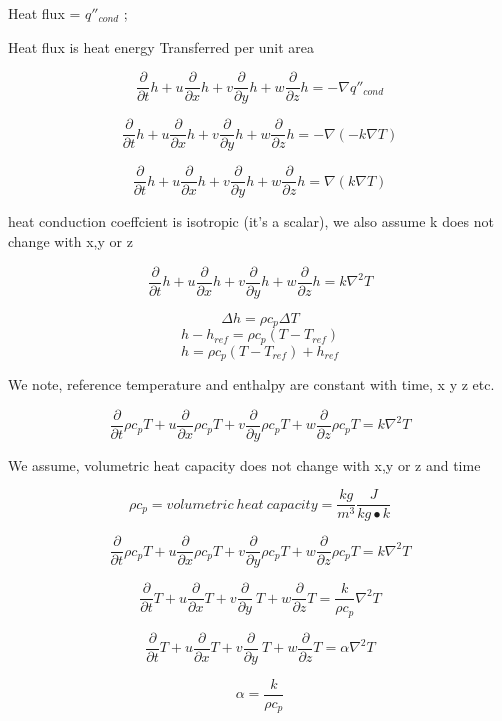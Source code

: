 \documentclass[11pt]{article}
\begin{document}
Heat flux = $q''_{cond}$ ; 

Heat flux is heat energy Transferred per unit area 

$$\frac{\partial }{\partial t} h + u \frac{\partial}{\partial x} h + v \frac{\partial }{\partial y} h + w \frac{\partial }{\partial z} h  = -\nabla q''_{cond} $$ 


$$\frac{\partial }{\partial t} h + u \frac{\partial}{\partial x} h + v \frac{\partial }{\partial y} h + w \frac{\partial }{\partial z} h  = -\nabla (- k \nabla T) $$ 

$$\frac{\partial }{\partial t} h + u \frac{\partial}{\partial x} h + v \frac{\partial }{\partial y} h + w \frac{\partial }{\partial z} h  = \nabla ( k \nabla T) $$ 

heat conduction coeffcient is isotropic (it's a scalar), we also assume k does not change with x,y or z

$$\frac{\partial }{\partial t} h + u \frac{\partial}{\partial x} h + v \frac{\partial }{\partial y} h + w \frac{\partial }{\partial z} h  = k \nabla^2 T $$ 

$$\Delta h = \rho c_p  \Delta T$$
$$h-h_{ref} = \rho c_p  (T-T_{ref})$$
$$h = \rho c_p  (T-T_{ref}) + h_{ref}$$

We note, reference temperature and enthalpy are constant with time, x y z etc.


$$\frac{\partial }{\partial t} \rho c_p T + u \frac{\partial}{\partial x} \rho c_p T + v \frac{\partial }{\partial y} \rho c_p T + w \frac{\partial }{\partial z} \rho c_p T  = k \nabla^2 T $$ 

We assume, volumetric heat capacity does not change with x,y or z and time

$$\rho c_p  = volumetric \ heat \ capacity = \frac{kg}{m^3} \frac{J}{kg \bullet k}$$

$$\frac{\partial }{\partial t} \rho c_p T + u \frac{\partial}{\partial x} \rho c_p T + v \frac{\partial }{\partial y} \rho c_p T + w \frac{\partial }{\partial z} \rho c_p T  = k \nabla^2 T $$ 

$$\frac{\partial }{\partial t} T + u \frac{\partial}{\partial x} T + v \frac{\partial }{\partial y} \ T + w \frac{\partial }{\partial z} T  = \frac{k}{\rho c_p} \nabla^2 T $$ 

$$\frac{\partial }{\partial t} T + u \frac{\partial}{\partial x} T + v \frac{\partial }{\partial y} \ T + w \frac{\partial }{\partial z} T  = \alpha \nabla^2 T $$ 

$$\alpha = \frac{k}{\rho c_p}$$
\end{document}
